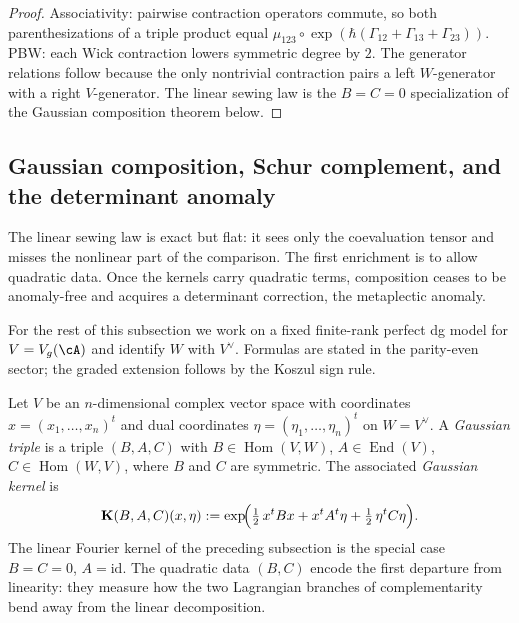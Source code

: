 \begin{proof}
Associativity: pairwise contraction operators commute, so both
parenthesizations of a triple product equal
$\mu_{123} \circ \exp(\hbar(\Gamma_{12} + \Gamma_{13} +
\Gamma_{23}))$. PBW: each Wick contraction lowers symmetric degree
by $2$. The generator relations follow because the only nontrivial
contraction pairs a left $W$-generator with a right $V$-generator.
The linear sewing law is the $B = C = 0$ specialization of the
Gaussian composition theorem below.
\end{proof}

\subsection{Gaussian composition, Schur complement, and the
determinant anomaly}
\label{subsec:holo-comp-gaussian-metaplectic}

The linear sewing law is exact but flat: it sees only the
coevaluation tensor and misses the nonlinear part of the comparison.
The first enrichment is to allow quadratic data. Once the kernels
carry quadratic terms, composition ceases to be anomaly-free and
acquires a determinant correction, the metaplectic anomaly.

\begin{convention}
\label{conv:holo-comp-parity-even}
For the rest of this subsection we work on a fixed finite-rank
perfect dg model for $V = V_g(\cA)$ and identify $W$ with $V^\vee$.
Formulas are stated in the parity-even sector; the graded extension
follows by the Koszul sign rule.
\end{convention}

\begin{definition}
\label{def:holo-comp-gaussian-triple}
Let $V$ be an $n$-dimensional complex vector space with coordinates
$x = (x_1, \ldots, x_n)^t$ and dual coordinates
$\eta = (\eta_1, \ldots, \eta_n)^t$ on $W = V^\vee$. A
\emph{Gaussian triple} is a triple $(B, A, C)$ with
$B \in \operatorname{Hom}(V, W)$,
$A \in \operatorname{End}(V)$,
$C \in \operatorname{Hom}(W, V)$,
where $B$ and $C$ are symmetric. The associated
\emph{Gaussian kernel} is
\begin{equation}\label{eq:holo-comp-gaussian-kernel}
\mathbf{K}(B, A, C)(x, \eta)
:=
\exp\!\Bigl(
\tfrac{1}{2}\, x^t B x + x^t A^t \eta
+ \tfrac{1}{2}\, \eta^t C \eta
\Bigr).
\end{equation}
The linear Fourier kernel of the preceding subsection is the
special case $B = C = 0$, $A = \mathrm{id}$. The quadratic data
$(B, C)$ encode the first departure from linearity: they measure
how the two Lagrangian branches of complementarity bend away from
the linear decomposition.
\end{definition}

